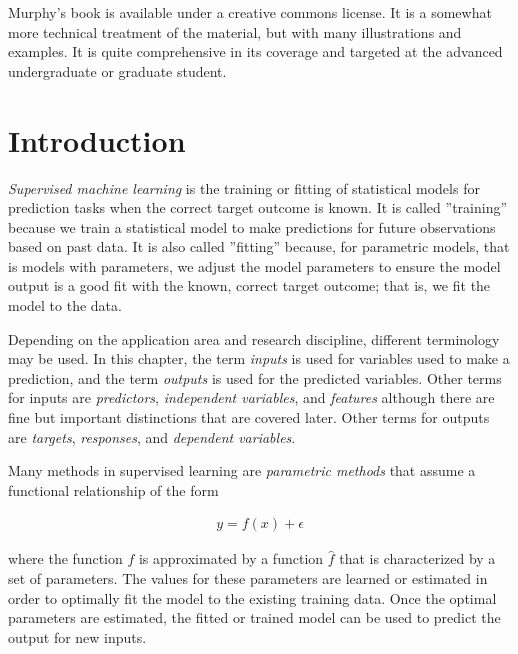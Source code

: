 Murphy's book is available under a creative commons license. It is a somewhat more technical treatment of the material, but with many illustrations and examples. It is quite comprehensive in its coverage and targeted at the advanced undergraduate or graduate student. 

\section{Introduction}

\emph{Supervised machine learning} is the training or fitting of statistical models for prediction tasks when the correct target outcome is known. It is called ''training'' because we train a statistical model to make predictions for future observations based on past data. It is also called ''fitting'' because, for parametric models, that is models with parameters, we adjust the model parameters to ensure the model output is a good fit with the known, correct target outcome; that is, we fit the model to the data. 

Depending on the application area and research discipline, different terminology may be used. In this chapter, the term \emph{inputs} is used for variables used to make a prediction, and the term \emph{outputs} is used for the predicted variables. Other terms for inputs are \emph{predictors}, \emph{independent variables}, and \emph{features} although there are fine but important distinctions that are covered later. Other terms for outputs are \emph{targets}, \emph{responses}, and \emph{dependent variables}.

Many methods in supervised learning are \emph{parametric methods} that assume a functional relationship of the form 

\begin{align*}
y = f(x) + \epsilon
\end{align*}

\noindent where the function $f$ is approximated by a function $\hat{f}$ that is characterized by a set of parameters. The values for these parameters are learned or estimated in order to optimally fit the model to the existing training data. Once the optimal parameters are estimated, the fitted or trained model can be used to predict the output for new inputs.

